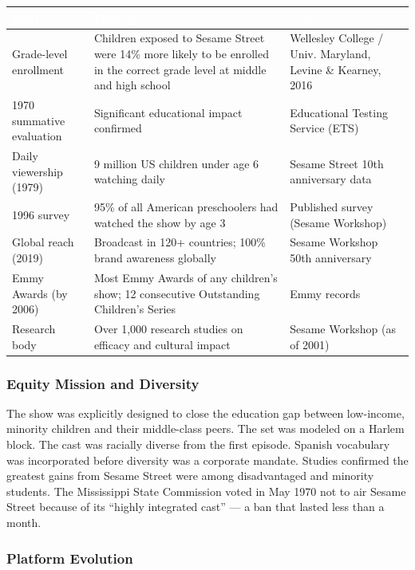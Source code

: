\documentclass[11pt,letterpaper]{article}
\newcommand{\tableheader}[1]{\textbf{\sffamily\textcolor{white}{#1}}}
\begin{document}
\begin{center}
\begin{tabularx}{\textwidth}{L{5cm}XL{3cm}}
\toprule
{}
\tableheader{Metric} & \tableheader{Finding} & \tableheader{Source} \\
\midrule
Grade-level enrollment & Children exposed to Sesame Street were 14\% more likely to be enrolled in the correct grade level at middle and high school & Wellesley College / Univ. Maryland, Levine \& Kearney, 2016 \\
1970 summative evaluation & Significant educational impact confirmed & Educational Testing Service (ETS) \\
Daily viewership (1979) & 9 million US children under age 6 watching daily & Sesame Street 10th anniversary data \\
1996 survey & 95\% of all American preschoolers had watched the show by age 3 & Published survey (Sesame Workshop) \\
Global reach (2019) & Broadcast in 120+ countries; 100\% brand awareness globally & Sesame Workshop 50th anniversary \\
Emmy Awards (by 2006) & Most Emmy Awards of any children's show; 12 consecutive Outstanding Children's Series & Emmy records \\
Research body & Over 1,000 research studies on efficacy and cultural impact & Sesame Workshop (as of 2001) \\
\bottomrule
\end{tabularx}
\end{center}

\subsubsection{Equity Mission and Diversity}

The show was explicitly designed to close the education gap between low-income, minority children and their middle-class peers. The set was modeled on a Harlem block. The cast was racially diverse from the first episode. Spanish vocabulary was incorporated before diversity was a corporate mandate. Studies confirmed the greatest gains from Sesame Street were among disadvantaged and minority students. The Mississippi State Commission voted in May 1970 not to air Sesame Street because of its ``highly integrated cast'' --- a ban that lasted less than a month.

\subsubsection{Platform Evolution}
\end{document}

